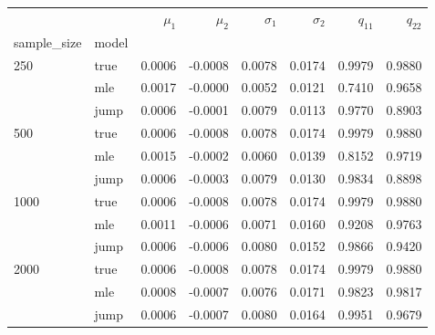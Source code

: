 \begin{tabular}{llrrrrrr}
\toprule
     &      &  $\mu_1$ &  $\mu_2$ &  $\sigma_1$ &  $\sigma_2$ &  $q_{11}$ &  $q_{22}$ \\
sample_size & model &          &          &             &             &           &           \\
\midrule
250  & true &   0.0006 &  -0.0008 &      0.0078 &      0.0174 &    0.9979 &    0.9880 \\
     & mle &   0.0017 &  -0.0000 &      0.0052 &      0.0121 &    0.7410 &    0.9658 \\
     & jump &   0.0006 &  -0.0001 &      0.0079 &      0.0113 &    0.9770 &    0.8903 \\
500  & true &   0.0006 &  -0.0008 &      0.0078 &      0.0174 &    0.9979 &    0.9880 \\
     & mle &   0.0015 &  -0.0002 &      0.0060 &      0.0139 &    0.8152 &    0.9719 \\
     & jump &   0.0006 &  -0.0003 &      0.0079 &      0.0130 &    0.9834 &    0.8898 \\
1000 & true &   0.0006 &  -0.0008 &      0.0078 &      0.0174 &    0.9979 &    0.9880 \\
     & mle &   0.0011 &  -0.0006 &      0.0071 &      0.0160 &    0.9208 &    0.9763 \\
     & jump &   0.0006 &  -0.0006 &      0.0080 &      0.0152 &    0.9866 &    0.9420 \\
2000 & true &   0.0006 &  -0.0008 &      0.0078 &      0.0174 &    0.9979 &    0.9880 \\
     & mle &   0.0008 &  -0.0007 &      0.0076 &      0.0171 &    0.9823 &    0.9817 \\
     & jump &   0.0006 &  -0.0007 &      0.0080 &      0.0164 &    0.9951 &    0.9679 \\
\bottomrule
\end{tabular}
